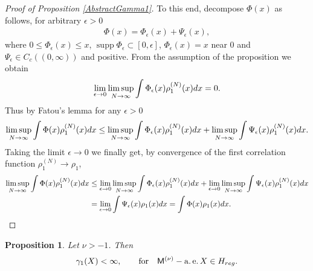 \documentclass[11pt]{article}
\numberwithin{equation}{section}
\newtheorem{Proposition}[Theorem]{Proposition}
{ \theoremstyle{definition}
\newtheorem{Definition}[Theorem]{Definition}
\newtheorem{Remark}[Theorem]{Remark} }
\begin{document}
\begin{proof}[Proof of Proposition \ref{AbstractGamma1}]
To this end, decompose $\Phi(x)$ as follows, for arbitrary $\epsilon>0$
\begin{gather*}
\Phi(x)=\Phi_{\epsilon}(x)+\Psi_{\epsilon}(x),
\end{gather*}
where $0\le \Phi_{\epsilon}(x)\le x$, $\operatorname{supp} \Phi_{\epsilon} \subset [0,\epsilon]$, $\Phi_{\epsilon}(x)=x$ near $0$ and $\Psi_{\epsilon}\in C_{c} ((0,\infty) )$ and positive. From the assumption of the proposition we obtain
\begin{gather*}
\lim_{\epsilon \to 0} \limsup_{N \to \infty}\int\Phi_{\epsilon}(x)\rho_1^{(N)}(x){\rm d}x=0.
\end{gather*}
Thus by Fatou's lemma for any $\epsilon>0$
\begin{gather*}
\limsup_{N \to \infty}\int\Phi(x)\rho_1^{(N)}(x){\rm d}x\le \limsup_{N \to \infty}\int\Phi_{\epsilon}(x)\rho_1^{(N)}(x){\rm d}x+\limsup_{N \to \infty}\int\Psi_{\epsilon}(x)\rho_1^{(N)}(x){\rm d}x.
\end{gather*}
Taking the limit $\epsilon \to 0$ we finally get, by convergence of the first correlation function $\rho_1^{(N)} \to \rho_1$,
\begin{align*}
\limsup_{N \to \infty}\int\Phi(x)\rho_1^{(N)}(x){\rm d}x&\le \lim_{\epsilon \to 0}\limsup_{N \to \infty}\int\Phi_{\epsilon}(x)\rho_1^{(N)}(x){\rm d}x+ \lim_{\epsilon \to 0}\limsup_{N \to \infty}\int\Psi_{\epsilon}(x)\rho_1^{(N)}(x){\rm d}x\\
&=\lim_{\epsilon \to 0}\int\Psi_{\epsilon}(x)\rho_1(x){\rm d}x=\int \Phi(x)\rho_1(x){\rm d}x.\tag*{\qed}
\end{align*}\renewcommand{\qed}{}
\end{proof}

\begin{Proposition}\label{FinitenessGamma1}Let $\nu>-1$. Then
\begin{gather*}
\gamma_1(X)<\infty, \qquad \text{for} \quad \mathsf{M}^{(\nu)}-\operatorname{a.e.} X \in H_{{\rm reg}}.
\end{gather*}
\end{Proposition}
\end{document}

